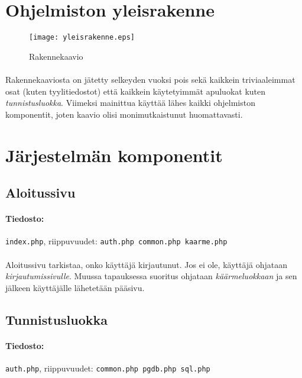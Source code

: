 \documentclass[11pt]{article}
\begin{document}

\section{Ohjelmiston yleisrakenne}

\begin{figure}[h]
\caption{Rakennekaavio}
\texttt{[image: yleisrakenne.eps]}
\end{figure}

\paragraph{} Rakennekaaviosta on jätetty selkeyden vuoksi pois sekä kaikkein triviaaleimmat osat (kuten tyylitiedostot) että kaikkein käytetyimmät apuluokat kuten \emph{tunnistusluokka}. Viimeksi mainittua käyttää lähes kaikki ohjelmiston komponentit, joten kaavio olisi monimutkaistunut huomattavasti.


\section{Järjestelmän komponentit}

\subsection{Aloitussivu}

\paragraph{Tiedosto:} \large{\texttt{index.php}}, riippuvuudet: \texttt{auth.php common.php kaarme.php}

\paragraph{} Aloitussivu tarkistaa, onko käyttäjä kirjautunut. Jos ei ole, käyttäjä ohjataan \emph{kirjautumissivulle}. Muussa tapauksessa suoritus ohjataan \emph{käärmeluokkaan} ja sen jälkeen käyttäjälle lähetetään pääsivu.


\subsection{Tunnistusluokka}

\paragraph{Tiedosto:} \large{\texttt{auth.php}}, riippuvuudet: \texttt{common.php pgdb.php sql.php}
\end{document}

